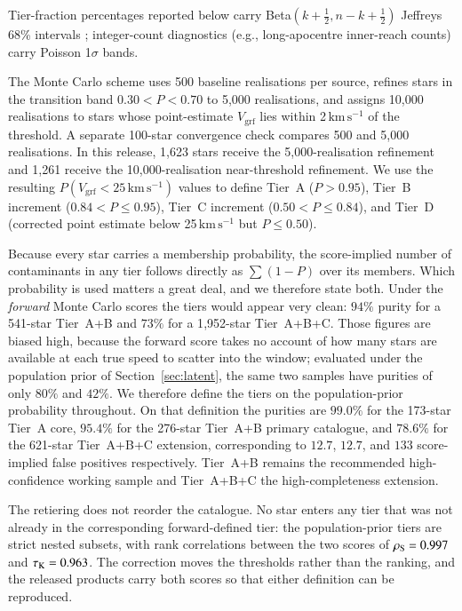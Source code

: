 \documentclass{aa}  %
\newcommand{\vgrf}{\ensuremath{V_{\mathrm{grf}}}\xspace}
\newcommand{\kms}{\ensuremath{\,\mathrm{km\,s^{-1}}}\xspace}
\begin{document}
Tier-fraction percentages reported below carry Beta$(k+\tfrac{1}{2},
n-k+\tfrac{1}{2})$ Jeffreys 68\% intervals \citep{Cameron2011};
integer-count diagnostics (e.g., long-apocentre inner-reach counts) carry
\citet{Gehrels1986} Poisson 1$\sigma$ bands.

The Monte Carlo scheme uses 500 baseline realisations per source,
refines stars in the transition band $0.30<P<0.70$ to 5,000
realisations, and assigns 10,000 realisations to stars whose
point-estimate $\vgrf$ lies within 2\kms{} of the threshold.  A separate
100-star convergence check compares 500 and 5,000 realisations.  In this
release, 1{,}623 stars receive the 5,000-realisation refinement and
1{,}261 receive the 10,000-realisation near-threshold refinement.  We use
the resulting $P(\vgrf<25\kms)$ values to define Tier~A ($P>0.95$),
Tier~B increment ($0.84<P\leq0.95$), Tier~C increment
($0.50<P\leq0.84$), and Tier~D (corrected point estimate below
25\kms{} but $P\leq0.50$).

Because every star carries a membership probability, the score-implied
number of contaminants in any tier follows directly as $\sum(1-P)$ over
its members.  Which probability is used matters a great deal, and we
therefore state both.  Under the \emph{forward} Monte Carlo scores the
tiers would appear very clean: $94\%$ purity for a 541-star Tier~A+B and
$73\%$ for a 1{,}952-star Tier~A+B+C.  Those figures are biased high,
because the forward score takes no account of how many stars are
available at each true speed to scatter into the window; evaluated under
the population prior of Section~\ref{sec:latent}, the same two samples
have purities of only $80\%$ and $42\%$.  We therefore define the tiers
on the population-prior probability throughout.  On that definition the
purities are $99.0\%$ for the 173-star Tier~A core, $95.4\%$ for the
276-star Tier~A+B primary catalogue, and $78.6\%$ for the 621-star
Tier~A+B+C extension, corresponding to $12.7$, $12.7$, and $133$
score-implied false positives respectively.  Tier~A+B remains the
recommended high-confidence working sample and Tier~A+B+C the
high-completeness extension.

The retiering does not reorder the catalogue.  No star enters any tier
that was not already in the corresponding forward-defined tier: the
population-prior tiers are strict nested subsets, with rank correlations
between the two scores of $\rho_{\rm S}=0.997$ and $\tau_{\rm K}=0.963$.
The correction moves the thresholds rather than the ranking, and the
released products carry both scores so that either definition can be
reproduced.
\end{document}
